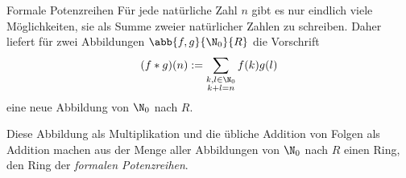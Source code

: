 \begin{karte}{Formale Potenzreihen}
    Für jede natürliche Zahl \(n\) gibt es nur eindlich viele Möglichkeiten, 
    sie als Summe zweier natürlicher Zahlen zu schreiben. Daher liefert für 
    zwei Abbildungen \( \abb{f,g}{\N_0}{R} \) die Vorschrift 
    \[ (f * g)(n) := \sum_{\substack{ k,l\in \N_0\\k+l=n }} f(k) g(l) \]
    eine neue Abbildung von \(\N_0\) nach \(R\).

    Diese Abbildung als Multiplikation und die übliche Addition von Folgen 
    als Addition machen aus der Menge aller Abbildungen von \(\N_0\) 
    nach \(R\) einen Ring, den Ring der \textit{formalen Potenzreihen}.
\end{karte}